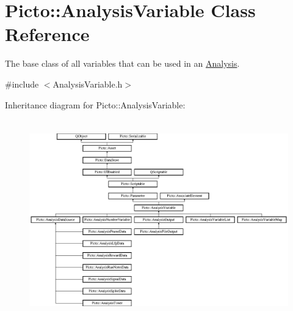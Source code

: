 \hypertarget{class_picto_1_1_analysis_variable}{\section{Picto\-:\-:Analysis\-Variable Class Reference}
\label{class_picto_1_1_analysis_variable}
}


The base class of all variables that can be used in an \hyperlink{class_picto_1_1_analysis}{Analysis}.  




{\ttfamily \#include $<$Analysis\-Variable.\-h$>$}

Inheritance diagram for Picto\-:\-:Analysis\-Variable\-:\begin{figure}[H]
\begin{center}
\leavevmode
\includegraphics[height=8.659794cm]{class_picto_1_1_analysis_variable}
\end{center}
\end{figure}
